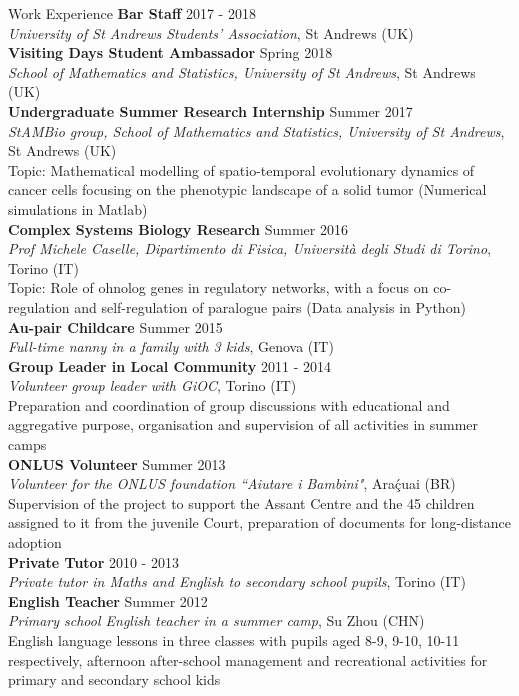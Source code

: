 \documentclass{resume} %
\begin{document}
\begin{rSection}{Work Experience}
{\bf Bar Staff} \hfill {2017 - 2018} \\
{{\em University of St Andrews Students’ Association}, St Andrews (UK)} \\
{\bf Visiting Days Student Ambassador} \hfill {Spring 2018} \\
{{\em School of Mathematics and Statistics, University of St Andrews}, St Andrews (UK)} \\
{\bf Undergraduate Summer Research Internship} \hfill {Summer 2017} \\
{{\em StAMBio group, School of Mathematics and Statistics, University of St Andrews}, St Andrews (UK) \\ Topic: Mathematical modelling of spatio-temporal evolutionary dynamics of cancer cells focusing on the phenotypic landscape of a solid tumor (Numerical simulations in Matlab)} \\
{\bf Complex Systems Biology Research} \hfill {Summer 2016} \\
{{\em Prof Michele Caselle, Dipartimento di Fisica, Universit{\`a} degli Studi di Torino}, Torino (IT)\\ Topic: Role of ohnolog genes in regulatory networks, with a focus on co-regulation and self-regulation of paralogue pairs (Data analysis in Python)} \\
{\bf Au-pair Childcare} \hfill {Summer 2015} \\
{{\em Full-time nanny in a family with 3 kids}, Genova (IT)} \\
{\bf Group Leader in Local Community} \hfill {2011 - 2014} \\
{{\em Volunteer group leader with GiOC}, Torino (IT) \\ Preparation and coordination of group discussions with educational and aggregative purpose, organisation and supervision of all activities in summer camps} \\
{\bf ONLUS Volunteer} \hfill {Summer 2013} \\
{{\em Volunteer for the ONLUS foundation ``Aiutare i Bambini"}, Ara\c{\'c}uai (BR) \\ Supervision of the project to support the Assant Centre and the 45 children assigned to it from the juvenile Court, preparation of documents for long-distance adoption} \\
{\bf Private Tutor} \hfill {2010 - 2013} \\
{{\em Private tutor in Maths and English to secondary school pupils}, Torino (IT)} \\
{\bf English Teacher} \hfill {Summer 2012} \\
{{\em Primary school English teacher in a summer camp}, Su Zhou (CHN)\\ {English language lessons in three classes with pupils aged 8-9, 9-10, 10-11 respectively, afternoon after-school management and recreational activities for primary and secondary school kids}} 
\end{rSection}  
\end{document}
